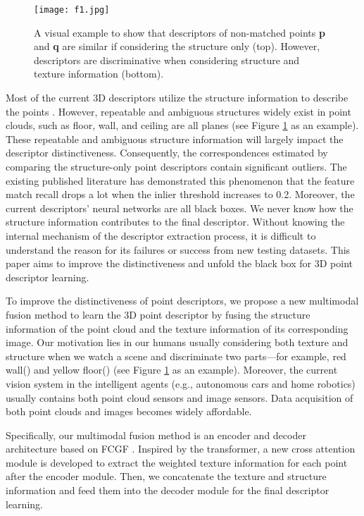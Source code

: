 \documentclass[10pt,twocolumn,letterpaper]{article}
\begin{document}
\begin{figure}[t]
	\texttt{[image: f1.jpg]}
	\caption{A visual example to show that descriptors of non-matched points \textbf{p} and \textbf{q} are similar if considering the structure only (top). However, descriptors are discriminative when considering structure and texture information (bottom).}
	\label{f1}
\end{figure}

Most of the current 3D descriptors utilize the structure information to describe the points \cite{rusu2009fast,choy2019fully,huang2021predator,ao2021spinnet}. 
However, repeatable and ambiguous structures widely exist in point clouds, such as floor, wall, and ceiling are all planes (see Figure \ref{f1} as an example). These repeatable and ambiguous structure information will largely impact the descriptor distinctiveness. Consequently, the correspondences estimated by comparing the structure-only point descriptors contain significant outliers. The existing published literature \cite{choy2019fully,huang2021predator,ao2021spinnet}  has demonstrated this phenomenon that the feature match recall drops a lot when the inlier threshold increases to 0.2. Moreover, the current descriptors' neural networks are all black boxes. We never know how the structure information contributes to the final descriptor. Without knowing the internal mechanism of the descriptor extraction process, it is difficult to understand the reason for its failures or success from new testing datasets. This paper aims to improve the distinctiveness and unfold the black box for 3D point descriptor learning.

To improve the distinctiveness of point descriptors, we propose a new multimodal fusion method to learn the 3D point descriptor by fusing the structure information of the point cloud and the texture information of its corresponding image.
Our motivation lies in our humans usually considering both texture and structure when we watch a scene and discriminate two parts—for example, red wall() and yellow floor() (see Figure \ref{f1} as an example). Moreover, the current vision system in the intelligent agents (e.g., autonomous cars and home robotics) usually contains both point cloud sensors and image sensors. Data acquisition of both point clouds and images becomes widely affordable.

Specifically, our multimodal fusion method is an encoder and decoder architecture based on FCGF \cite{choy2019fully}. Inspired by the transformer\cite{vaswani2017attention}, a new cross attention module is developed to extract the weighted texture information for each point after the encoder module. Then, we concatenate the texture and structure information and feed them into the decoder module for the final descriptor learning. 
\end{document}
